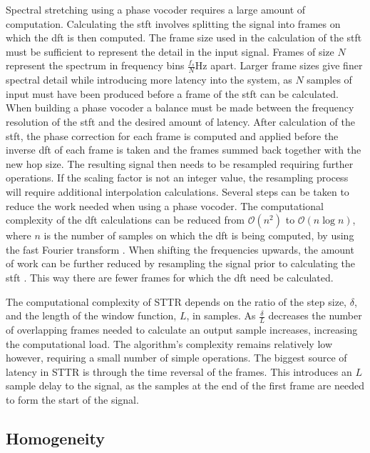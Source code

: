 		Spectral stretching using a phase vocoder requires a large amount of computation. Calculating the
		\acrshort{stft} involves splitting the signal into frames on which the \acrshort{dft} is then computed. The
		frame size used in the calculation of the \acrshort{stft} must be sufficient to represent the detail in the
		input signal. Frames of size $N$ represent the spectrum in frequency bins $\frac{f_{s}}{N}$Hz apart. Larger
		frame sizes give finer spectral detail while introducing more latency into the system, as $N$ samples of
		input must have been produced before a frame of the \acrshort{stft} can be calculated. When building a
		phase vocoder a balance must be made between the frequency resolution of the \acrshort{stft} and the
		desired amount of latency. After calculation of the \acrshort{stft}, the phase correction for each frame is
		computed and applied before the inverse \acrshort{dft} of each frame is taken and the frames summed back
		together with the new hop size. The resulting signal then needs to be resampled requiring further
		operations. If the scaling factor is not an integer value, the resampling process will require additional
		interpolation calculations. Several steps can be taken to reduce the work needed when using a phase
		vocoder. The computational complexity of the \acrshort{dft} calculations can be reduced from $\mathcal{O}
		\left( n^{2} \right)$ to $\mathcal{O}(n\log{n})$, where $n$ is the number of samples on which the
		\acrshort{dft} is being computed, by using the fast Fourier transform \citep{portnoff1976implementation}.
		When shifting the frequencies upwards, the amount of work can be further reduced by resampling the signal
		prior to calculating the \acrshort{stft} \citep{laroche1999new}. This way there are fewer frames for which
		the \acrshort{dft} need be calculated.

		The computational complexity of STTR depends on the ratio of the step size, $\delta$, and the length of the
		window function, $L$, in samples. As $\frac{\delta}{L}$ decreases the number of overlapping frames needed
		to calculate an output sample increases, increasing the computational load. The algorithm's complexity
		remains relatively low however, requiring a small number of simple operations. The biggest source of
		latency in STTR is through the time reversal of the frames. This introduces an $L$ sample delay to the
		signal, as the samples at the end of the first frame are needed to form the start of the signal.

	\subsection{Homogeneity}
	\label{sec:ExcitationEvaluation-Comparison-Homogeneity}
